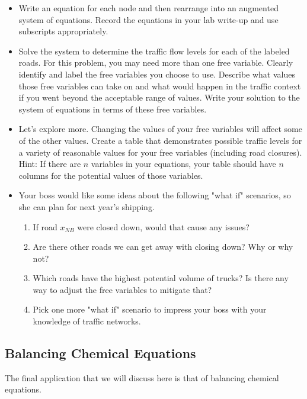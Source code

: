 \begin{lab}
\begin{itemize}
\item Write an equation for each node and then rearrange into an augmented system of equations.  Record the equations in your lab write-up and use subscripts appropriately.

\item  Solve the system to determine the traffic flow levels for each of the labeled roads.   For this problem, you may need more than one free variable.   Clearly identify and label the free variables you choose to use.  Describe what values those free variables can take on and what would happen in the traffic context if you went beyond the acceptable range of values.  Write your solution to the system of equations in terms of these free variables.

\item  Let's explore more.  Changing the values of your free variables will affect some of the other values.  Create a table that demonstrates possible traffic levels for a variety of reasonable values for your free variables (including road closures).   Hint:  If there are $n$ variables in your equations, your table should have $n$ columns for the potential values of those variables.

\item  Your boss would like some ideas about the following "what if" scenarios, so she can plan for next year's shipping.

	\begin{enumerate}
		\item  If road $x_{NB}$ were closed down, would that cause any issues?
		\item  Are there other roads we can get away with closing down?  Why or why not?
		\item  Which roads have the highest potential volume of trucks?   Is there any way to adjust the free variables to mitigate that?
		\item  Pick one more "what if" scenario to impress your boss with your knowledge of traffic networks.
	\end{enumerate}

\end{itemize}
\end{lab}


\subsection{Balancing Chemical Equations}
The final application that we will discuss here is that of balancing chemical equations.  

